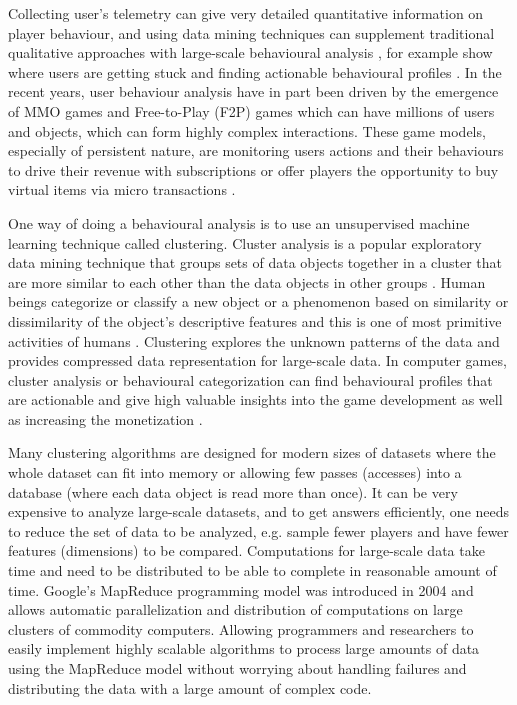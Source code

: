 Collecting user's telemetry can give very detailed quantitative information on player behaviour, and using data mining techniques can supplement traditional qualitative approaches with large-scale behavioural analysis \citep{Yannakakis:2012}, for example show where users are getting stuck and finding actionable behavioural profiles \citep{Kim:2008Tracking, Drachen:2012, Drachen:2011Evaluating}. In the recent years, user behaviour analysis have in part been driven by the emergence of MMO games and Free-to-Play (F2P) games which can have millions of users and objects, which can form highly complex interactions. These game models, especially of persistent nature, are monitoring users actions and their behaviours to drive their revenue with subscriptions or offer players the opportunity to buy virtual items via micro transactions \citep{Kim:2008Tracking, Drachen:2011Evaluating, Fields:2011SocialGame, Seif:2013GameAnalytics}. 

One way of doing a behavioural analysis is to use an unsupervised machine learning technique called clustering. Cluster analysis is a popular exploratory data mining technique that groups sets of data objects together in a cluster that are more similar to each other than the data objects in other groups \citep{Xu:2005Clustering}. Human beings categorize or classify a new object or a phenomenon based on similarity or dissimilarity of the object's descriptive features and this is one of most primitive activities of humans \citep{Anderberg:1973ClusterAnalysis}. Clustering explores the unknown patterns of the data and provides compressed data representation for large-scale data. In computer games, cluster analysis or behavioural categorization can find behavioural profiles that are actionable and give high valuable insights into the game development as well as increasing the monetization \cite{Drachen:2009Tomb, Mahlmann:2010Tomb}. 

Many clustering algorithms are designed for modern sizes of datasets where the whole dataset can fit into memory or allowing few passes (accesses) into a database (where each data object is read more than once). It can be very expensive to analyze large-scale datasets, and to get answers efficiently, one needs to reduce the set of data to be analyzed, e.g. sample fewer players and have fewer features (dimensions) to be compared. Computations for large-scale data take time and need to be distributed to be able to complete in reasonable amount of time. Google's MapReduce programming model was introduced in 2004 \citep{Dean:2004} and allows automatic parallelization and distribution of computations on large clusters of commodity computers. Allowing programmers and researchers to easily implement highly scalable algorithms to process large amounts of data using the MapReduce model without worrying about handling failures and distributing the data with a large amount of complex code. 

